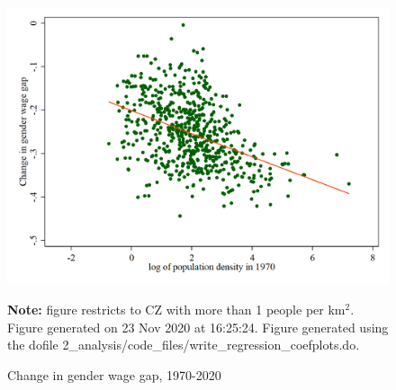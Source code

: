 \begin{figure}[!h]
\centering
\caption{Change in gender wage gap, 1970-2020}
\label{figure:overall_change}
\includegraphics[width=.5\textwidth]{../2_analysis/output/figures/change_1970_2020}
\par \begin{minipage}[h]{\textwidth}{\tiny\textbf{Note:} figure restricts to CZ with more than 1 people per km$^2$. Figure generated on 23 Nov 2020 at 16:25:24. Figure generated using the dofile 2\_analysis/code\_files/write\_regression\_coefplots.do.}\end{minipage}
\end{figure}
